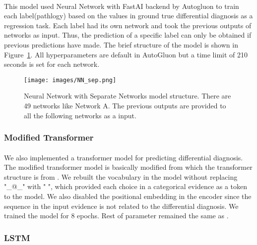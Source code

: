 \documentclass{article}
\begin{document}
\paragraph{ }
This model used Neural Network with FastAI backend by Autogluon to train each label(pathlogy) based on the values in ground true differential diagnosis as a regression task. Each label had its own network and took the previous outputs of networks as input. Thus, the prediction of a specific label can only be obtained if previous predictions have made. The brief structure of the model is shown in Figure~\ref{fig:Figure 3}. All hyperparameters are default in AutoGluon but a time limit of 210 seconds is set for each network. 

\begin{figure}[h]
\centering
\texttt{[image: images/NN\_sep.png]}
\caption{Neural Network with Separate Networks model structure. There are 49 networks like Network A. The previous outputs are provided to all the following networks as a input.
}
\label{fig:Figure 3}
\end{figure}

\subsubsection{Modified Transformer}
\paragraph{ }
We also implemented a transformer model for predicting differential diagnosis. The modified transformer model is basically modified from \parencite{Alam_2023} which the transformer structure is from \parencite{Dong_2021}. We rebuilt the vocabulary in the model without replacing "\_@\_" with " ", which provided each choice in a categorical evidence as a token to the model. We also disabled the positional embedding in the encoder since the sequence in the input evidence is not related to the differential diagnosis. We trained the model for 8 epochs. Rest of parameter remained the same as \parencite{Alam_2023}.

\subsubsection{LSTM}
\end{document}

